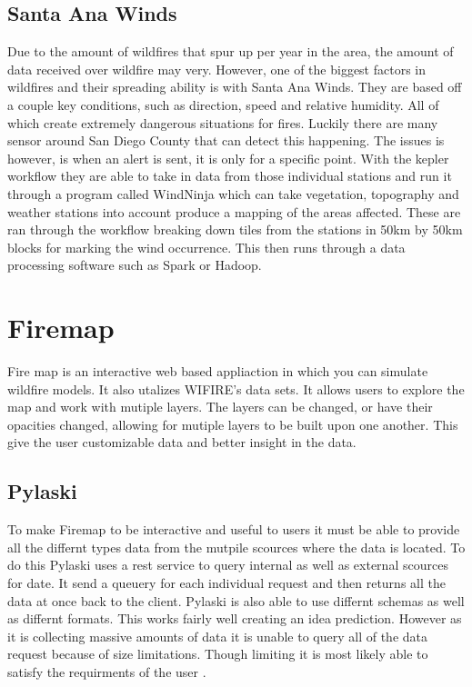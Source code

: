 \documentclass[sigconf]{acmart}
\begin{document}
\subsection{Santa Ana Winds}
Due to the amount of wildfires that spur up per year in the area, the amount of data received over wildfire may very.   However, one of the biggest factors in wildfires and their spreading ability is with Santa Ana Winds.  They are based off a couple key conditions, such as direction, speed and  relative humidity.  All of which create extremely dangerous situations for fires.  Luckily there are many sensor around San Diego County that can detect this happening.  The issues is however, is when an alert is sent, it is only for a specific point.  With the kepler workflow they are able to take in data from those individual stations and run it through a program called WindNinja which can take vegetation, topography and weather stations into account produce a mapping of the areas affected.  These are ran through the workflow breaking down tiles from the stations in 50km by 50km blocks for marking the wind occurrence.  This then runs through a data processing software such as Spark or Hadoop.

\section{Firemap}
Fire map is an interactive web based appliaction in which you can simulate wildfire models.  It also utalizes WIFIRE's data sets.  It allows users to explore the map and work with mutiple layers.  The layers can be changed, or have their opacities changed, allowing for mutiple layers to be built upon one another.  This give the user customizable data and better insight in the data. 

\subsection{Pylaski}
To make Firemap to be interactive and useful to users it must be able to provide all the differnt types data from the mutpile scources where the data is located.  To do this Pylaski uses a rest service to query internal as well as external scources for date.  It send a queuery for each individual request and then returns all the data at once back to the client.  Pylaski is also able to use differnt schemas as well as differnt formats.  This works fairly well creating an idea prediction.  However as it is collecting massive amounts of data it is unable to query all of the data request because of size limitations.  Though limiting it is most likely able to satisfy the requirments of the user \cite{CRAWLFiremap}. 
\end{document}
